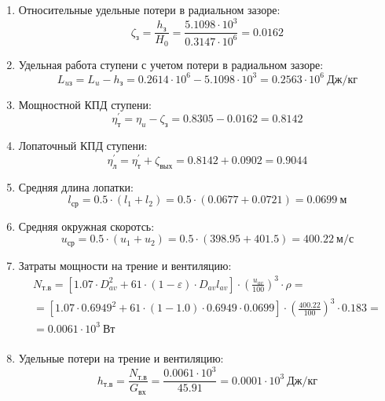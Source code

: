 \documentclass[a4paper,12pt]{article}
\begin{document}
\begin{enumerate}
        \item Относительные удельные потери в радиальном зазоре:
        \[
            \zeta_з = \frac{ h_з }{ H_0 } =
                \frac{ 5.1098 \cdot 10^3 }{ 0.3147 \cdot 10^6 } =
            0.0162
        \]

        \item Удельная работа ступени с учетом потери в радиальном зазоре:
        \[
            L_{uз} = L_u - h_з = 0.2614 \cdot 10^6 -
                5.1098 \cdot 10^3 =
            0.2563 \cdot 10^6 \ Дж/кг
        \]

        \item Мощностной КПД ступени:
        \[
            \eta_т^\prime = \eta_u - \zeta_з =
                0.8305 - 0.0162 = 0.8142
        \]

        \item Лопаточный КПД ступени:
        \[
            \eta_л^\prime = \eta_т^\prime + \zeta_{вых} =
                 0.8142 +  0.0902 =
            0.9044
        \]

        \item Средняя длина лопатки:
        \[
            l_{ср} = 0.5 \cdot (l_1 + l_2) =
                0.5 \cdot (0.0677 + 0.0721) =
            0.0699\ м
        \]

        \item Средняя окружная скоротсь:
        \[
            u_{ср} = 0.5 \cdot (u_1 + u_2) =
                0.5 \cdot (398.95 + 401.5) =
            400.22\ м/с
        \]

        \item Затраты мощности на трение и вентиляцию:
        \begin{gather*}
            N_{т.в} = \left[
                    1.07 \cdot D_{av}^2 + 61 \cdot (1 - \varepsilon) \cdot D_{av} l_{av}
            \right] \cdot
            \left(
                \frac{ u_{av} }{ 100 }
            \right) ^ 3 \cdot
            \rho =\\
            = \left[
                1.07 \cdot 0.6949^2 +
                61 \cdot (1 - 1.0) \cdot
                0.6949 \cdot 0.0699
            \right] \cdot
            \left(
                \frac{ 400.22 }{ 100 }
            \right) ^ 3 \cdot
            0.183=\\
            = 0.0061 \cdot 10^3 \ Вт \\
        \end{gather*}

        \item Удельные потери на трение и вентиляцию:
        \[
            h_{т.в} = \frac{ N_{т.в} }{ G_{вх} } =
                \frac{
                    0.0061 \cdot 10^3
                }{
                    45.91
                }
            = 0.0001 \cdot 10^3 \ Дж/кг
        \]


\end{enumerate}
\end{document}
